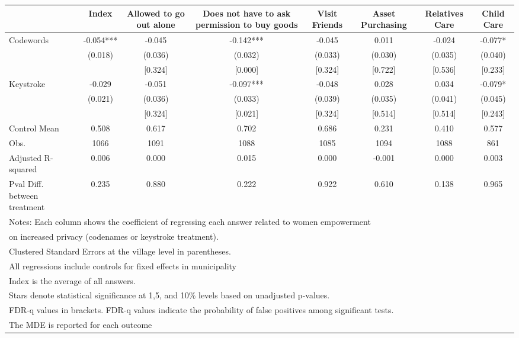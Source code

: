 {
\def\sym#1{\ifmmode^{#1}\else\(^{#1}\)\fi}
\begin{tabular}{l*{7}{c}}
\toprule
                &\multicolumn{1}{c}{Index}&\multicolumn{1}{c}{Allowed to go out alone}&\multicolumn{1}{c}{Does not have to ask permission to buy goods}&\multicolumn{1}{c}{Visit Friends}&\multicolumn{1}{c}{Asset Purchasing}&\multicolumn{1}{c}{Relatives Care}&\multicolumn{1}{c}{Child Care}\\
\midrule
Codewords       &   -0.054***&   -0.045   &   -0.142***&   -0.045   &    0.011   &   -0.024   &   -0.077*  \\
                &  (0.018)   &  (0.036)   &  (0.032)   &  (0.033)   &  (0.030)   &  (0.035)   &  (0.040)   \\
                &            &  [0.324]   &  [0.000]   &  [0.324]   &  [0.722]   &  [0.536]   &  [0.233]   \\
Keystroke       &   -0.029   &   -0.051   &   -0.097***&   -0.048   &    0.028   &    0.034   &   -0.079*  \\
                &  (0.021)   &  (0.036)   &  (0.033)   &  (0.039)   &  (0.035)   &  (0.041)   &  (0.045)   \\
                &            &  [0.324]   &  [0.021]   &  [0.324]   &  [0.514]   &  [0.514]   &  [0.243]   \\
\midrule
Control Mean    &    0.508   &    0.617   &    0.702   &    0.686   &    0.231   &    0.410   &    0.577   \\
Obs.            &     1066   &     1091   &     1088   &     1085   &     1094   &     1088   &      861   \\
Adjusted R-squared&    0.006   &    0.000   &    0.015   &    0.000   &   -0.001   &    0.000   &    0.003   \\
Pval Diff. between treatment&    0.235   &    0.880   &    0.222   &    0.922   &    0.610   &    0.138   &    0.965   \\
\bottomrule
\multicolumn{8}{l}{\footnotesize Notes: Each column shows the coefficient of regressing each answer related to women empowerment}\\
\multicolumn{8}{l}{\footnotesize on increased privacy (codenames or keystroke treatment).}\\
\multicolumn{8}{l}{\footnotesize Clustered Standard Errors at the village level in parentheses.}\\
\multicolumn{8}{l}{\footnotesize All regressions include controls for fixed effects in municipality}\\
\multicolumn{8}{l}{\footnotesize Index is the average of all answers.}\\
\multicolumn{8}{l}{\footnotesize Stars denote statistical significance at 1,5, and 10\% levels based on unadjusted p-values.}\\
\multicolumn{8}{l}{\footnotesize FDR-q values in brackets. FDR-q values indicate the probability of false positives among significant tests.}\\
\multicolumn{8}{l}{\footnotesize The MDE is reported for each outcome}\\
\end{tabular}
}
